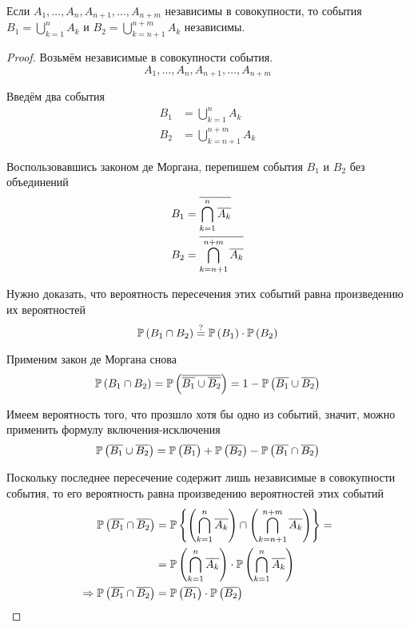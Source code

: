 \begin{affirmation}
    Если $A_1, \dots, A_n, A_{n+1}, \dots, A_{n+m}$ независимы в совокупности,
    то события
    $B_1=\bigcup_{k=1}^n A_k$ и $B_2=\bigcup_{k=n+1}^{n+m} A_k$ независимы.
\end{affirmation}
\begin{proof}
    Возьмём независимые в совокупности события.
    $$A_1, \dots, A_n, A_{n+1}, \dots, A_{n+m}$$
    
    Введём два события
    \begin{align*}
    B_1&=\bigcup_{k=1}^n A_k\\
    B_2&=\bigcup_{k=n+1}^{n+m} A_k
    \end{align*}

    Воспользовавшись законом де Моргана,
    перепишем события $B_1$ и $B_2$ без объединений
    \begin{align*}
    B_1&=\overline{\bigcap_{k=1}^n \overline{A_k}}\\
    B_2&=\overline{\bigcap_{k=n+1}^{n+m} \overline{A_k}}
    \end{align*}

    Нужно доказать, что вероятность пересечения этих событий
    равна произведению их вероятностей
    \begin{equation}\label{eq:main_unions}
    \mathbb{P}\left( B_1\cap B_2 \right)
        \stackrel{\rm ?}{=}\mathbb{P}\left( B_1 \right)\cdot\mathbb{P}\left( B_2 \right)
    \end{equation}

    Применим закон де Моргана снова
    \begin{equation}\label{eq:de_morgan_result}
    \mathbb{P}\left( B_1\cap B_2 \right)
    =\mathbb{P}\left( \overline{\overline{B_1}\cup \overline{B_2}} \right)
    =1-\mathbb{P}\left( {\overline{B_1}\cup \overline{B_2}} \right)
    \end{equation}

    Имеем вероятность того, что прозшло хотя бы одно из событий,
    значит, можно применить формулу включения-исключения
    \begin{equation}\label{eq:incl_excl_result}
    \mathbb{P}\left( \overline{B_1}\cup \overline{B_2} \right)
    =\mathbb{P}\left( \overline{B_1} \right)+\mathbb{P}\left( \overline{B_2} \right)
        -\mathbb{P}\left( \overline{B_1}\cap \overline{B_2} \right)
    \end{equation}

    Поскольку последнее пересечение
    содержит лишь независимые в совокупности события,
    то его вероятность равна произведению вероятностей этих событий
    \begin{align*}
        \mathbb{P}\left( \overline{B_1}\cap \overline{B_2} \right)
            &=\mathbb{P}\left\{ 
                \left(\bigcap_{k=1}^n \overline{A_k}\right)
                \cap
                \left(\bigcap_{k=n+1}^{n+m} \overline{A_k}\right) \right\}=\\
            &=\mathbb{P}\left( \bigcap_{k=1}^{n} \overline{A_k} \right)
                \cdot\mathbb{P}\left( \bigcap_{k=1}^{n} \overline{A_k} \right)\\
        \Rightarrow\mathbb{P}\left( \overline{B_1}\cap \overline{B_2} \right)
            &=\mathbb{P}\left( \overline{B_1} \right)\cdot\mathbb{P}\left( \overline{B_2} \right)
    \end{align*}


\end{proof}
